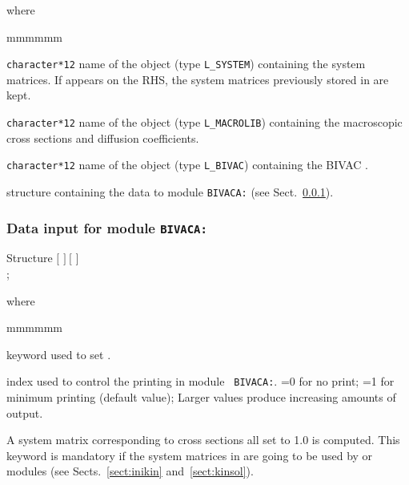 \noindent where
\begin{ListeDeDescription}{mmmmmm}

\item[\dusa{SYST}] {\tt character*12} name of the  object (type {\tt L\_SYSTEM}) containing the system matrices. If  appears on the RHS, the system matrices previously stored in  are kept.

\item[\dusa{MACRO}] {\tt character*12} name of the  object (type {\tt L\_MACROLIB}) containing the macroscopic cross sections and diffusion coefficients.

\item[\dusa{TRACK}] {\tt character*12} name of the  object (type {\tt L\_BIVAC}) containing the BIVAC .

\item[\dstr{bivaca\_data}] structure containing the data to module {\tt BIVACA:} (see Sect.~\ref{sect:bivaca_data}).

\end{ListeDeDescription}

\vskip 0.2cm

\subsubsection{Data input for module {\tt BIVACA:}}\label{sect:bivaca_data}

\begin{DataStructure}{Structure }
$[$   $]~[$  $]$ \\
;
\end{DataStructure}

\noindent where
\begin{ListeDeDescription}{mmmmmm}

\item[\moc{EDIT}] keyword used to set .

\item[\dusa{iprint}] index used to control  the printing in module {\tt
BIVACA:}. =0 for no print; =1 for minimum printing (default value); Larger
values produce increasing amounts of output.

\item[\moc{UNIT}] A system matrix corresponding to cross sections all set to 1.0 is computed. This keyword is mandatory if
the system matrices in  are going to be used by  or  modules (see Sects.~\ref{sect:inikin}
and~\ref{sect:kinsol}).

\end{ListeDeDescription}
\clearpage

